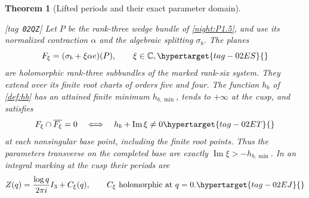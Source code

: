 \documentclass[11pt,a4paper]{article}
\numberwithin{equation}{section}
\newtheorem{theorem}{Theorem}[section]
\theoremstyle{definition}
\newcommand{\StatementRecord}[4]{{\upshape\footnotesize[tag~\texttt{#3}]}\enspace\ignorespaces}
\begin{document}
\begin{theorem}[Lifted periods and their exact parameter domain]
\hypertarget{tag-02O8}{}\hypertarget{tag-02QZ}{}
\label{maps:src:F.3.6}\label{night:P1.8}
\StatementRecord{night:P1.8}{proved}{02QZ}{\cref{night:P1.5,night:P1.15,def:hb}}
Let $P$ be the rank-three wedge bundle of \cref{night:P1.5}, and use
its normalized contraction $\alpha$ and the algebraic splitting $\sigma_b$.
The planes
\begin{equation}
 F_\xi=(\sigma_b+\xi\alpha e)(P),\qquad \xi\in\mathbb C,
 \hypertarget{tag-02ES}{}\label{maps:eq:F.21}
\end{equation}
are holomorphic rank-three subbundles of the marked rank-six system.
They extend over its finite root charts of orders five and four.
The function $h_b$ of \cref{def:hb} has an attained finite minimum
$h_{b,\min}$, tends to $+\infty$ at the cusp, and satisfies
\begin{equation}
 F_\xi\cap\overline{F_\xi}=0
 \quad\Longleftrightarrow\quad
 h_b+\operatorname{Im}\xi\ne0
 \hypertarget{tag-02ET}{}\label{maps:eq:F.22}
\end{equation}
at each nonsingular base point, including the finite root points.
Thus the parameters transverse on the completed base are exactly
$\operatorname{Im}\xi>-h_{b,\min}$.
In an integral marking at the cusp their periods are
\begin{equation}
 Z(q)=\frac{\log q}{2\pi i}I_3+C_\xi(q),
 \qquad C_\xi\text{ holomorphic at }q=0.
 \hypertarget{tag-02EJ}{}\label{maps:eq:F.13}
\end{equation}
\end{theorem}
\end{document}
